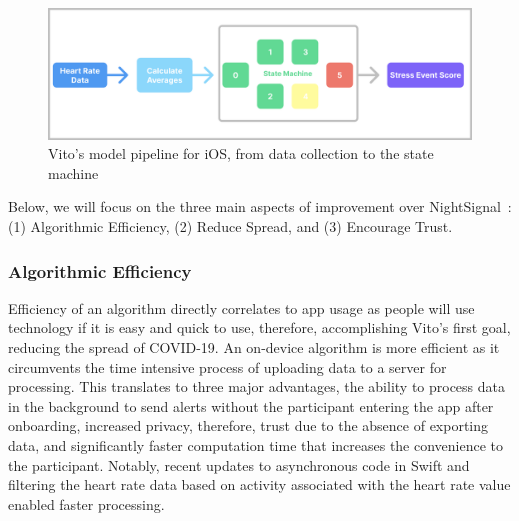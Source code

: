 \documentclass{article}
\newcommand\todo[1]{\textcolor{blue}{#1}}
\begin{document}
\begin{figure}

\begin{center}
\includegraphics[scale=0.15]{VitoPipeline.png}
\end{center}
\caption{
Vito's model pipeline for iOS, from data collection to the state machine}
\label{fig:model}
\end{figure}


Below, we will focus on the three main aspects of improvement over NightSignal~\cite{NightSignal}: (1) Algorithmic Efficiency, (2) Reduce Spread, and (3) Encourage Trust.



\subsubsection{Algorithmic Efficiency}
Efficiency of an algorithm directly correlates to app usage as people will use technology if it is easy and quick to use, therefore, accomplishing Vito's first goal, reducing the spread of COVID-19. An on-device algorithm is more efficient as it circumvents the time intensive process of uploading data to a server for processing.  This translates to three major advantages, the ability to process data in the background to send alerts without the participant entering the app after onboarding, increased privacy, therefore, trust due to the absence of exporting data, and significantly faster computation time that increases the convenience to the participant.  Notably, recent updates to asynchronous code in Swift and filtering the heart rate data based on activity associated with the heart rate value enabled faster processing.  
\end{document}
